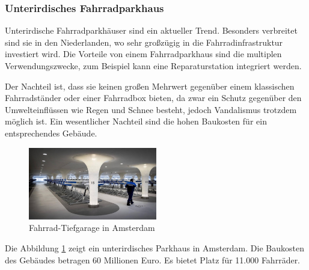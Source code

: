 \subsubsection{Unterirdisches Fahrradparkhaus}
Unterirdische Fahrradparkhäuser sind ein aktueller Trend. Besonders verbreitet sind sie in den Niederlanden, wo sehr großzügig in die Fahrradinfrastruktur investiert wird. Die Vorteile von einem Fahrradparkhaus sind die multiplen Verwendungszwecke, zum Beispiel kann eine Reparaturstation integriert werden.

\noindent Der Nachteil ist, dass sie keinen großen Mehrwert gegenüber einem klassischen Fahrradständer oder einer Fahrradbox bieten, da zwar ein Schutz gegenüber den Umwelteinflüssen wie Regen und Schnee besteht, jedoch Vandalismus trotzdem möglich ist. Ein wesentlicher Nachteil sind die hohen Baukosten für ein entsprechendes Gebäude.

\begin{figure}[H]
    \centering
    \includegraphics[width=0.5\textwidth]{images/unterirdischesfahrradparkhaus.jpg}
    \caption{Fahrrad-Tiefgarage in Amsterdam }
    \label{fig:fahradtiefgarage}
\end{figure}

\noindent Die Abbildung \ref{fig:fahradtiefgarage} zeigt ein unterirdisches Parkhaus in Amsterdam. Die Baukosten des Gebäudes betragen 60 Millionen Euro. Es bietet Platz für 11.000 Fahrräder.
